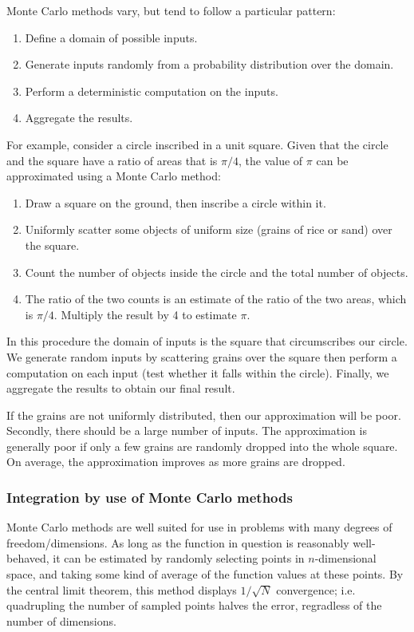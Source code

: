 Monte Carlo methods vary, but tend to follow a particular pattern:
\begin{enumerate}
  \item Define a domain of possible inputs.
  \item Generate inputs randomly from a probability distribution over the domain.
  \item Perform a deterministic computation on the inputs.
  \item Aggregate the results.
\end{enumerate}

For example, consider a circle inscribed in a unit square. Given that the circle and the square have a ratio of areas that is $\pi/4$, the value of $\pi$ can be approximated using a Monte Carlo method:
\begin{enumerate}
  \item Draw a square on the ground, then inscribe a circle within it.
  \item Uniformly scatter some objects of uniform size (grains of rice or sand) over the square.
  \item Count the number of objects inside the circle and the total number of objects.
  \item The ratio of the two counts is an estimate of the ratio of the two areas, which is $\pi/4$. Multiply the result by 4 to estimate $\pi$.
\end{enumerate}
In this procedure the domain of inputs is the square that circumscribes our circle. We generate random inputs by scattering grains over the square then perform a computation on each input (test whether it falls within the circle). Finally, we aggregate the results to obtain our final result.

If the grains are not uniformly distributed, then our approximation will be poor. Secondly, there should be a large number of inputs. The approximation is generally poor if only a few grains are randomly dropped into the whole square. On average, the approximation improves as more grains are dropped.


\subsubsection{Integration by use of Monte Carlo methods} %
\label{ssub:integration_by_use_of_monte_carlo_methods}
Monte Carlo methods are well suited for use in problems with many degrees of freedom/dimensions. As long as the function in question is reasonably well-behaved, it can be estimated by randomly selecting points in $n$-dimensional space, and taking some kind of average of the function values at these points. By the central limit theorem, this method displays $1/\sqrt{N}$ convergence; i.e. quadrupling the number of sampled points halves the error, regradless of the number of dimensions.

